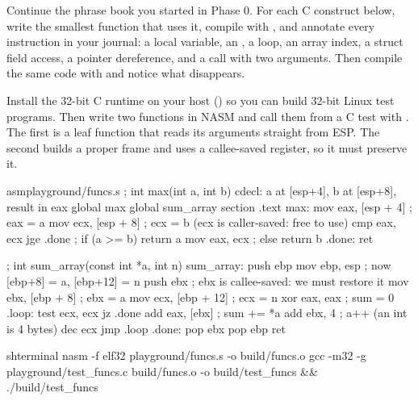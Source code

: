\documentclass[11pt,a4paper]{article}
\begin{document}
Continue the phrase book you started in Phase 0. For each C construct below, write the smallest function that uses
it, compile with , and annotate every instruction in your journal: a
local variable, an , a  loop, an array index, a struct field access, a pointer dereference, and a
call with two arguments. Then compile the same code with  and notice what disappears.

Install the 32-bit C runtime on your host () so you can build
32-bit Linux test programs. Then write two functions in NASM and call them from a C test with . The
first is a leaf function that reads its arguments straight from ESP. The second builds a proper frame and uses a
callee-saved register, so it must preserve it.

\begin{lst}{asm}{playground/funcs.s}
; int max(int a, int b)      cdecl: a at [esp+4], b at [esp+8], result in eax
global max
global sum_array
section .text
max:
    mov  eax, [esp + 4]     ; eax = a
    mov  ecx, [esp + 8]     ; ecx = b   (ecx is caller-saved: free to use)
    cmp  eax, ecx
    jge  .done              ; if (a >= b) return a
    mov  eax, ecx           ; else return b
.done:
    ret

; int sum_array(const int *a, int n)
sum_array:
    push ebp
    mov  ebp, esp           ; now [ebp+8] = a, [ebp+12] = n
    push ebx                ; ebx is callee-saved: we must restore it
    mov  ebx, [ebp + 8]     ; ebx = a
    mov  ecx, [ebp + 12]    ; ecx = n
    xor  eax, eax           ; sum = 0
.loop:
    test ecx, ecx
    jz   .done
    add  eax, [ebx]         ; sum += *a
    add  ebx, 4             ; a++   (an int is 4 bytes)
    dec  ecx
    jmp  .loop
.done:
    pop  ebx
    pop  ebp
    ret
\end{lst}

\begin{lst}{sh}{terminal}
nasm -f elf32 playground/funcs.s -o build/funcs.o
gcc -m32 -g playground/test_funcs.c build/funcs.o -o build/test_funcs && ./build/test_funcs
\end{lst}
\end{document}
